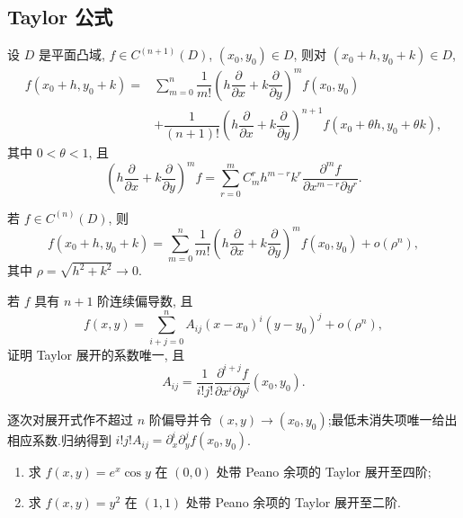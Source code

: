 \subsection{Taylor 公式}

\begin{theorem}
    设 $D$ 是平面凸域, $f\in C^{(n+1)}(D)$, $(x_0,y_0)\in D$, 则对 $(x_0+h,y_0+k)\in D$,
    \[
        \begin{aligned}
            f(x_0+h,y_0+k)
            ={} & \sum\limits_{m=0}^n\dfrac{1}{m!}
            \left(h\dfrac{\partial}{\partial x}+k\dfrac{\partial}{\partial y}\right)^m f(x_0,y_0) \\
                & +\dfrac{1}{(n+1)!}
            \left(h\dfrac{\partial}{\partial x}+k\dfrac{\partial}{\partial y}\right)^{n+1}
            f(x_0+\theta h,y_0+\theta k),
        \end{aligned}
    \]
    其中 $0<\theta<1$, 且
    \[
        \left(h\dfrac{\partial}{\partial x}+k\dfrac{\partial}{\partial y}\right)^mf
        =\sum\limits_{r=0}^mC_m^r h^{m-r}k^r
        \dfrac{\partial^mf}{\partial x^{m-r}\partial y^r}.
    \]
\end{theorem}

\begin{theorem}
    若 $f\in C^{(n)}(D)$, 则
    \[
        f(x_0+h,y_0+k)
        =\sum\limits_{m=0}^n\dfrac{1}{m!}
        \left(h\dfrac{\partial}{\partial x}+k\dfrac{\partial}{\partial y}\right)^m f(x_0,y_0)
        +o(\rho^n),
    \]
    其中 $\rho=\sqrt{h^2+k^2}\to0$.
\end{theorem}

\begin{example}[\markstar]
    若 $f$ 具有 $n+1$ 阶连续偏导数, 且
    \[
        f(x,y)=\sum\limits_{i+j=0}^nA_{ij}(x-x_0)^i(y-y_0)^j+o(\rho^n),
    \]
    证明 Taylor 展开的系数唯一, 且
    \[
        A_{ij}=\dfrac{1}{i!j!}
        \dfrac{\partial^{i+j}f}{\partial x^i\partial y^j}(x_0,y_0).
    \]
\end{example}
\exampleblank

\begin{solution}
    逐次对展开式作不超过 $n$ 阶偏导并令 $(x,y)\to(x_0,y_0)$;最低未消失项唯一给出相应系数.归纳得到 $i!j!A_{ij}=\partial_x^i\partial_y^jf(x_0,y_0)$.
\end{solution}

\begin{example}
    \begin{enumerate}
        \item 求 $f(x,y)=e^x\cos y$ 在 $(0,0)$ 处带 Peano 余项的 Taylor 展开至四阶;
        \item 求 $f(x,y)=y^2$ 在 $(1,1)$ 处带 Peano 余项的 Taylor 展开至二阶.
    \end{enumerate}
\end{example}
\exampleblank

